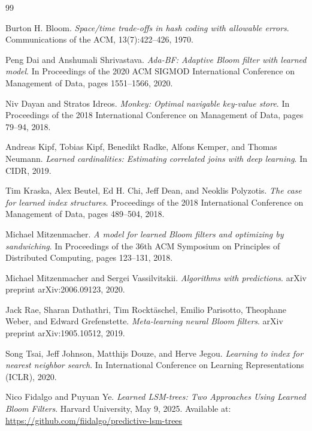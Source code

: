 \documentclass{mnitjaipur}
\begin{document}
\begin{thebibliography}{99}

Burton H. Bloom.
\textit{Space/time trade-offs in hash coding with allowable errors}.
Communications of the ACM, 13(7):422–426, 1970.

Peng Dai and Anshumali Shrivastava.
\textit{Ada-BF: Adaptive Bloom filter with learned model}.
In Proceedings of the 2020 ACM SIGMOD International Conference on Management of Data, pages 1551–1566, 2020.

Niv Dayan and Stratos Idreos.
\textit{Monkey: Optimal navigable key-value store}.
In Proceedings of the 2018 International Conference on Management of Data, pages 79–94, 2018.

Andreas Kipf, Tobias Kipf, Benedikt Radke, Alfons Kemper, and Thomas Neumann.
\textit{Learned cardinalities: Estimating correlated joins with deep learning}.
In CIDR, 2019.

Tim Kraska, Alex Beutel, Ed H. Chi, Jeff Dean, and Neoklis Polyzotis.
\textit{The case for learned index structures}.
Proceedings of the 2018 International Conference on Management of Data, pages 489–504, 2018.

Michael Mitzenmacher.
\textit{A model for learned Bloom filters and optimizing by sandwiching}.
In Proceedings of the 36th ACM Symposium on Principles of Distributed Computing, pages 123–131, 2018.

Michael Mitzenmacher and Sergei Vassilvitskii.
\textit{Algorithms with predictions}.
arXiv preprint arXiv:2006.09123, 2020.

Jack Rae, Sharan Dathathri, Tim Rocktäschel, Emilio Parisotto, Theophane Weber, and Edward Grefenstette.
\textit{Meta-learning neural Bloom filters}.
arXiv preprint arXiv:1905.10512, 2019.

Song Tsai, Jeff Johnson, Matthijs Douze, and Herve Jegou.
\textit{Learning to index for nearest neighbor search}.
In International Conference on Learning Representations (ICLR), 2020.

Nico Fidalgo and Puyuan Ye.
\textit{Learned LSM-trees: Two Approaches Using Learned Bloom Filters}.
Harvard University, May 9, 2025.
Available at: \url{https://github.com/fiidalgo/predictive-lsm-trees}

\end{thebibliography}
\end{document}
